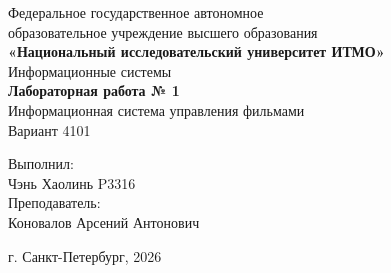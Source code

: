 \begin{titlepage}
\centering
Федеральное государственное автономное \\
образовательное учреждение высшего образования \\
\textbf{«Национальный исследовательский университет ИТМО»} \\
\vfill
Информационные системы\\
\vspace{0.5\baselineskip}
\textbf{Лабораторная работа № 1} \\
\vspace{0.5\baselineskip}
Информационная система управления фильмами\\
Вариант 4101\\
\vfill
\begin{flushright}
Выполнил:\\
Чэнь Хаолинь P3316\\
Преподаватель:\\
Коновалов Арсений Антонович\\
\end{flushright}
\vspace{4\baselineskip}
\centering
г. Санкт-Петербург, 2026
\end{titlepage}
